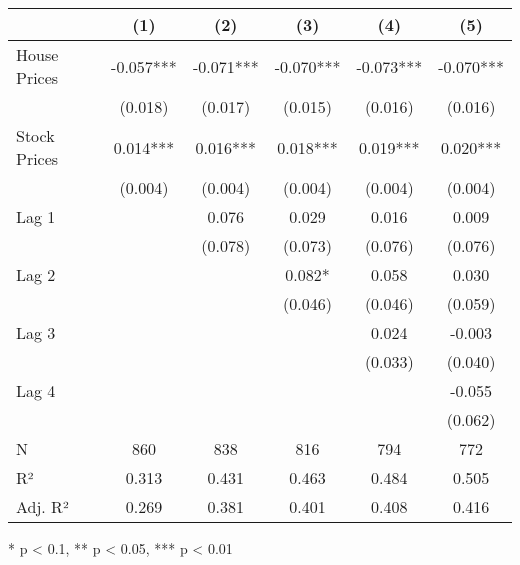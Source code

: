 \begin{table}[h]
\fontsize{9.0pt}{10.8pt}\selectfont
\begin{tabular*}{\linewidth}{@{\extracolsep{\fill}}lccccc}
\toprule
  & (1) & (2) & (3) & (4) & (5) \\ 
\midrule\addlinespace[2.5pt]
House Prices & -0.057*** & -0.071*** & -0.070*** & -0.073*** & -0.070*** \\ 
 & (0.018) & (0.017) & (0.015) & (0.016) & (0.016) \\ 
Stock Prices & 0.014*** & 0.016*** & 0.018*** & 0.019*** & 0.020*** \\ 
 & (0.004) & (0.004) & (0.004) & (0.004) & (0.004) \\ 
Lag 1 &  & 0.076 & 0.029 & 0.016 & 0.009 \\ 
 &  & (0.078) & (0.073) & (0.076) & (0.076) \\ 
Lag 2 &  &  & 0.082* & 0.058 & 0.030 \\ 
 &  &  & (0.046) & (0.046) & (0.059) \\ 
Lag 3 &  &  &  & 0.024 & -0.003 \\ 
 &  &  &  & (0.033) & (0.040) \\ 
Lag 4 &  &  &  &  & -0.055 \\ 
{} & {} & {} & {} & {} & {(0.062)} \\ 
N & 860 & 838 & 816 & 794 & 772 \\ 
R² & 0.313 & 0.431 & 0.463 & 0.484 & 0.505 \\ 
Adj. R² & 0.269 & 0.381 & 0.401 & 0.408 & 0.416 \\ 
\bottomrule
\end{tabular*}
\begin{minipage}{\linewidth}
* p < 0.1, ** p < 0.05, *** p < 0.01\\
\end{minipage}
\end{table}


